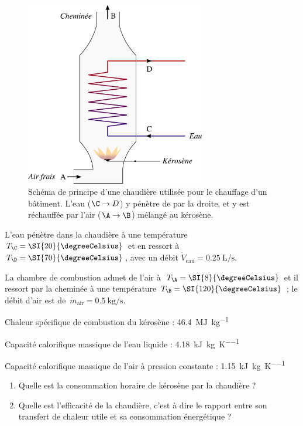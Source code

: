 	\begin{figure}
		\begin{center}
			\includegraphics[width=0.7\textwidth]{images/chaudiere_eau.png}
		\end{center}
		\caption{Schéma de principe d’une chaudière utilisée pour le chauffage d’un bâtiment. L’eau ($\C \to D$) y pénètre de par la droite, et y est réchauffée par l’air ($\A \to \B$) mélangé au kérosène.}
		\label{fig_chaudiere_eau}
	\end{figure}
	
	L’eau pénètre dans la chaudière à une température $T_\C = \SI{20}{\degreeCelsius}$ et en ressort à $T_\D = \SI{70}{\degreeCelsius}$, avec un débit $\dot V_{\text{eau}} = \SI{0,25}{\liter\per\second}$.
	
	La chambre de combustion admet de l’air à~$T_\A = \SI{8}{\degreeCelsius}$ et il ressort par la cheminée à une température $T_\B = \SI{120}{\degreeCelsius}$ ; le débit d’air est de~$\dot m_{\text{air}} = \SI{0,5}{\kilogram\per\second}$.
	
	\TabPositions{11cm}
	Chaleur spécifique de combustion du kérosène  : 			\tab \SI{46,4}{\mega\joule\per\kilogram}
	
	Capacité calorifique massique de l’eau liquide  : 			\tab \SI{4,18}{\kilo\joule\per\kilogram\per\kelvin}
	
	Capacité calorifique massique de l’air à pression constante  : 	\tab \SI{1,15}{\kilo\joule\per\kilogram\per\kelvin}
	\TabPositions{6cm} %

	\begin{enumerate}
	\item Quelle est la consommation horaire de kérosène par la chaudière ?
	\item Quelle est l’efficacité de la chaudière, c’est à dire le rapport entre son transfert de chaleur utile et sa consommation énergétique ?
	\end{enumerate}



